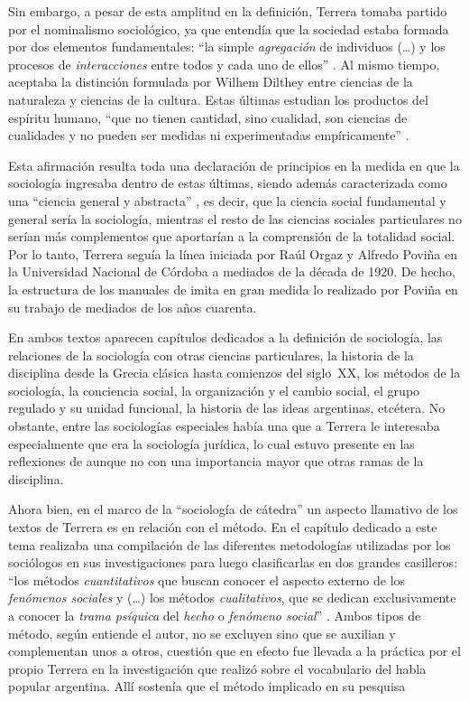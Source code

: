 Sin embargo, a pesar de esta amplitud en la definición, Terrera tomaba partido por el nominalismo sociológico, ya que entendía que la sociedad estaba formada por dos elementos fundamentales: \enquote{la simple \emph{agregación} de individuos (\dots) y los procesos de \emph{interacciones} entre todos y cada uno de ellos} \parencite[pág.~9, énfasis en el original]{1715-TERRERA1966}. Al mismo tiempo, aceptaba la distinción formulada por Wilhem Dilthey entre ciencias de la naturaleza y ciencias de la cultura. Estas últimas estudian los productos del espíritu humano, \enquote{que no tienen cantidad, sino cualidad, son ciencias de cualidades y no pueden ser medidas ni experimentadas empíricamente} \parencite[17]{1715-TERRERA1966}.

Esta afirmación resulta toda una declaración de principios en la medida en que la sociología ingresaba dentro de estas últimas, siendo además caracterizada como una \enquote{ciencia general y abstracta} \parencite[20]{1715-TERRERA1966}, es decir, que la ciencia social fundamental y general sería la sociología, mientras el resto de las ciencias sociales particulares no serían más complementos que aportarían a la comprensión de la totalidad social. Por lo tanto, Terrera seguía la línea iniciada por Raúl Orgaz y Alfredo Poviña en la Universidad Nacional de Córdoba a mediados de la década de 1920. De hecho, la estructura de los manuales de \textcite{1715-TERRERA1966,1716-TERRERA1969} imita en gran medida lo realizado por Poviña en su trabajo de mediados de los años cuarenta.

En ambos textos aparecen capítulos dedicados a la definición de sociología, las relaciones de la sociología con otras ciencias particulares, la historia de la disciplina desde la Grecia clásica hasta comienzos del siglo~XX, los métodos de la sociología, la conciencia social, la organización y el cambio social, el grupo regulado y su unidad funcional, la historia de las ideas argentinas, etcétera. No obstante, entre las sociologías especiales había una que a Terrera le interesaba especialmente que era la sociología jurídica, lo cual estuvo presente en las reflexiones de \textcite{1533-POVINA1954} aunque no con una importancia mayor que otras ramas de la disciplina.

Ahora bien, en el marco de la \enquote{sociología de cátedra} un aspecto llamativo de los textos de Terrera es en relación con el método. En el capítulo dedicado a este tema realizaba una compilación de las diferentes metodologías utilizadas por los sociólogos en sus investigaciones para luego clasificarlas en dos grandes casilleros: \enquote{los métodos \emph{cuantitativos} que buscan conocer el aspecto externo de los \emph{fenómenos sociales} y (\dots) los métodos \emph{cualitativos}, que se dedican exclusivamente a conocer la \emph{trama psíquica} del \emph{hecho} o \emph{fenómeno social}} \parencite[pág.~46, énfasis en el original]{1715-TERRERA1966}. Ambos tipos de método, según entiende el autor, no se excluyen sino que se auxilian y complementan unos a otros, cuestión que en efecto fue llevada a la práctica por el propio Terrera en la investigación que realizó sobre el vocabulario del habla popular argentina. Allí sostenía que el método implicado en su pesquisa

